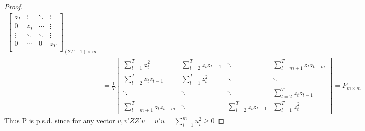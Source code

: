 \documentclass[DIV=14,titlepage=false]{scrreprt}
\begin{document}
\begin{proof}
\begin{align*}
{\begin{bmatrix}
            z_T & \vdots & \ddots & \vdots \\
            0 & z_T & \cdots & \vdots \\
            \vdots & \ddots & \ddots & \vdots \\
            0 & \cdots & 0 & z_T \\
        \end{bmatrix}}_{(2T-1)\times m}\\
        &= \frac{1}{T}\begin{bmatrix}
             \sum_{l=1}^{T}z_t^2 &  \sum_{l=2}^{T}z_tz_{t-1} & \ddots & \sum_{l=m+1}^{T}z_tz_{t-m}\\
             \sum_{l=2}^{T}z_tz_{t-1} &  \sum_{l=1}^{T}z_t^2 & \ddots & \ddots\\
            \ddots & \ddots & \ddots &  \sum_{l=2}^{T}z_tz_{t-1}\\
            \sum_{l=m+1}^{T}z_tz_{t-m} & \ddots &  \sum_{l=2}^{T}z_tz_{t-1} &   \sum_{l=1}^{T}z_t^2
        \end{bmatrix}
        =P_{m\times m}
    \end{align*}
Thus P is p.s.d. since for any vector $v, v'ZZ'v=u'u=\sum_{i=1}^{m}u_i^2\geq 0$
\end{proof}
\end{document}
